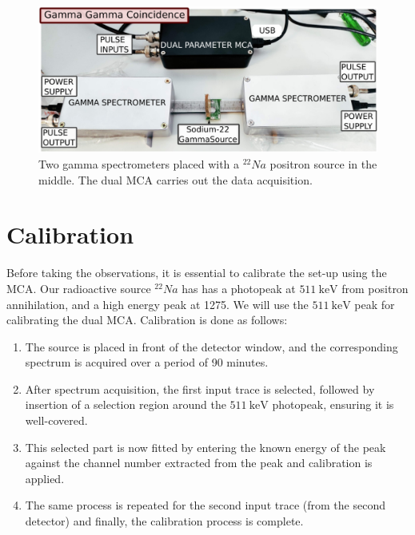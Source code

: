 \documentclass[%
 reprint,
nofootinbib,
 amsmath,amssymb,
 aps,
floatfix,
]{revtex4-2}
\begin{document}
    \begin{figure}
        \centering
        \includegraphics[scale = 0.33]{Figures/setup2.png}
        \caption{Two gamma spectrometers placed with a $^{22} Na$ positron source in the middle. The dual MCA carries out the data acquisition.}
        \label{fig:my_label}
    \end{figure}
    
    
\section{Calibration}
    Before taking the observations, it is essential to calibrate the set-up using the MCA. Our radioactive source $^{22} Na$ has has a photopeak at $\SI{511}{\kilo \electronvolt}$ from positron annihilation, and a high energy peak at 1275. We will use the $\SI{511}{\kilo \electronvolt}$ peak for calibrating the dual MCA. Calibration is done as follows:
    \begin{enumerate}
        \item The source is placed in front of the detector window, and the corresponding spectrum is acquired over a period of 90 minutes.
        \item After spectrum acquisition, the first input trace is selected, followed by insertion of a selection region around the $\SI{511}{\kilo \electronvolt}$ photopeak, ensuring it is well-covered.
        \item This selected part is now fitted by entering the known energy of the peak against the channel number extracted from the peak and calibration is applied.
        \item The same process is repeated for the second input trace (from the second detector) and finally, the calibration process is complete.
    \end{enumerate}
\end{document}
